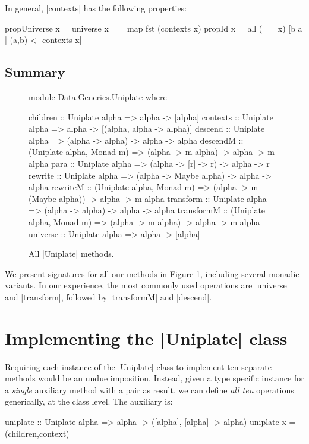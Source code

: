 In general, |contexts| has the following properties:

\begin{code}
propUniverse  x = universe x == map fst (contexts x)
propId        x = all (== x) [b a | (a,b) <- contexts x]
\end{code}



\subsection{Summary}

\begin{figure}
\begin{code}
module Data.Generics.Uniplate where

children    :: Uniplate alpha => alpha -> [alpha]
contexts    :: Uniplate alpha => alpha -> [(alpha, alpha -> alpha)]
descend     :: Uniplate alpha => (alpha -> alpha) -> alpha -> alpha
descendM    :: (Uniplate alpha, Monad m) => (alpha -> m alpha) -> alpha -> m alpha
para        :: Uniplate alpha => (alpha -> [r] -> r) -> alpha -> r
rewrite     :: Uniplate alpha => (alpha -> Maybe alpha) -> alpha -> alpha
rewriteM    :: (Uniplate alpha, Monad m)  => (alpha -> m (Maybe alpha)) -> alpha -> m alpha
transform   :: Uniplate alpha => (alpha -> alpha) -> alpha -> alpha
transformM  :: (Uniplate alpha, Monad m) => (alpha -> m alpha) -> alpha -> m alpha
universe    :: Uniplate alpha => alpha -> [alpha]
\end{code}
\caption{All |Uniplate| methods.}
\label{figU:play}
\end{figure}

We present signatures for all our methods in Figure \ref{figU:play}, including several monadic variants. In our experience, the most commonly used operations are |universe| and |transform|, followed by |transformM| and |descend|.


\section{Implementing the |Uniplate| class}
\label{secU:implement_play}

Requiring each instance of the |Uniplate| class to implement ten separate methods would be an undue imposition. Instead, given a type specific instance for a \textit{single} auxiliary method with a pair as result, we can define \textit{all ten} operations generically, at the class level. The auxiliary is:

\begin{code}
uniplate :: Uniplate alpha => alpha -> ([alpha], [alpha] -> alpha)
uniplate x = (children,context)
\end{code}

